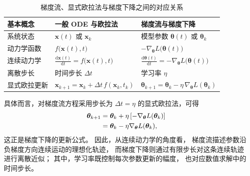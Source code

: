 \begin{table}[htbp]
    \centering
    \caption{梯度流、显式欧拉法与梯度下降之间的对应关系}
    \label{tab:gradient-flow-gradient-descent}
    \renewcommand{\arraystretch}{1.35}
    \begin{tabular}{
        >{\centering\arraybackslash}p{}
        >{\centering\arraybackslash}p{}
        >{\centering\arraybackslash}p{}
    }
        \toprule
        \textbf{基本概念}
        &
        \textbf{一般 ODE 与欧拉法}
        &
        \textbf{梯度流与梯度下降}
        \\
        \midrule

        系统状态
        &
        \(\boldsymbol{x}(t)\) 或 \(\boldsymbol{x}_k\)
        &
        模型参数
        \(\boldsymbol{\theta}(t)\) 或 \(\boldsymbol{\theta}_k\)
        \\

        动力学函数
        &
        \(f\bigl(\boldsymbol{x}(t),t\bigr)\)
        &
        \(-\nabla_{\boldsymbol{\theta}}
        L\bigl(\boldsymbol{\theta}(t)\bigr)\)
        \\

        连续动力学
        &
        \(\displaystyle
        \frac{\mathrm{d}\boldsymbol{x}(t)}{\mathrm{d}t}
        =
        f\bigl(\boldsymbol{x}(t),t\bigr)\)
        &
        \(\displaystyle
        \frac{\mathrm{d}\boldsymbol{\theta}(t)}{\mathrm{d}t}
        =
        -
        \nabla_{\boldsymbol{\theta}}
        L\bigl(\boldsymbol{\theta}(t)\bigr)\)
        \\

        离散步长
        &
        时间步长 \(\Delta t\)
        &
        学习率 \(\eta\)
        \\

        显式欧拉更新
        &
        \(\displaystyle
        \boldsymbol{x}_{k+1}
        =
        \boldsymbol{x}_k
        +
        \Delta t\,
        f(\boldsymbol{x}_k,t_k)\)
        &
        \(\displaystyle
        \boldsymbol{\theta}_{k+1}
        =
        \boldsymbol{\theta}_k
        -
        \eta\,
        \nabla_{\boldsymbol{\theta}}
        L(\boldsymbol{\theta}_k)\)
        \\

        \bottomrule
    \end{tabular}
\end{table}

具体而言，对梯度流方程采用步长为
\(\Delta t=\eta\)
的显式欧拉法，可得
\begin{align}
    \boldsymbol{\theta}_{k+1}
    &=
    \boldsymbol{\theta}_k
    +
    \eta
    \left[
        -
        \nabla_{\boldsymbol{\theta}}
        L(\boldsymbol{\theta}_k)
    \right]
    \notag\\
    &=
    \boldsymbol{\theta}_k
    -
    \eta
    \nabla_{\boldsymbol{\theta}}
    L(\boldsymbol{\theta}_k),
    \label{eq:gradient-descent-as-euler}
\end{align}
这正是梯度下降的更新公式。
因此，从连续动力学的角度看，
梯度流描述参数沿负梯度方向连续运动的理想化轨迹，
而梯度下降则通过有限步长对这条连续轨迹进行离散近似；
其中，学习率既控制每次参数更新的幅度，
也对应数值求解中的时间步长。

